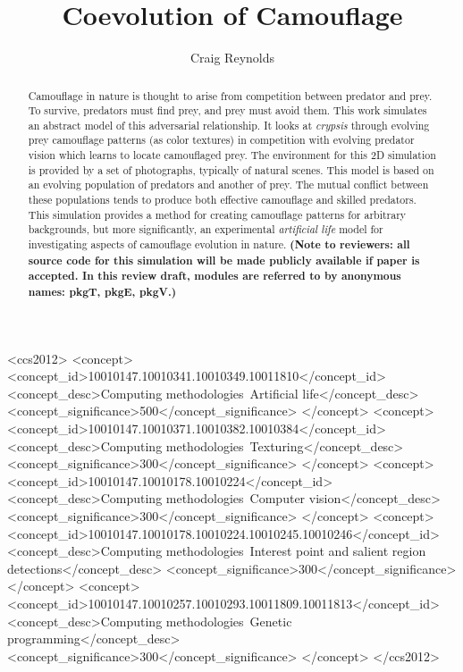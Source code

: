 \documentclass[acmtog]{acmart}
\newcommand{\texsyn}[0]{pkgT}
\newcommand{\lazypredator}[0]{pkgE}
\newcommand{\predatoreye}[0]{pkgV}
\begin{document}
\title{Coevolution of Camouflage}

\author{Craig Reynolds}

\renewcommand{\shortauthors}{Craig Reynolds}


\begin{abstract}
    Camouflage in nature is thought to arise from competition between predator and prey. To survive, predators must find prey, and prey must avoid them. This work simulates an abstract model of this adversarial relationship. It looks at \textit{crypsis} through evolving prey camouflage patterns (as color textures) in competition with evolving predator vision which learns to locate camouflaged prey. The environment for this 2D simulation is provided by a set of photographs, typically of natural scenes. This model is based on an evolving population of predators and another of prey. The mutual conflict between these populations tends to produce both effective camouflage and skilled predators. This simulation provides a method for creating camouflage patterns for arbitrary backgrounds, but more significantly, an experimental \textit{artificial life} model for investigating aspects of camouflage evolution in nature. \textbf{(Note to reviewers: all source code for this simulation will be made publicly available if paper is accepted. In this review draft, modules are referred to by anonymous names: \texsyn{}, \lazypredator{}, \predatoreye{}.)}
\end{abstract}


\begin{CCSXML}
<ccs2012>
   <concept>
       <concept_id>10010147.10010341.10010349.10011810</concept_id>
       <concept_desc>Computing methodologies~Artificial life</concept_desc>
       <concept_significance>500</concept_significance>
       </concept>
   <concept>
       <concept_id>10010147.10010371.10010382.10010384</concept_id>
       <concept_desc>Computing methodologies~Texturing</concept_desc>
       <concept_significance>300</concept_significance>
       </concept>
   <concept>
       <concept_id>10010147.10010178.10010224</concept_id>
       <concept_desc>Computing methodologies~Computer vision</concept_desc>
       <concept_significance>300</concept_significance>
       </concept>
    <concept>
       <concept_id>10010147.10010178.10010224.10010245.10010246</concept_id>
       <concept_desc>Computing methodologies~Interest point and salient region detections</concept_desc>
       <concept_significance>300</concept_significance>
       </concept>
    <concept>
        <concept_id>10010147.10010257.10010293.10011809.10011813</concept_id>
        <concept_desc>Computing methodologies~Genetic programming</concept_desc>
        <concept_significance>300</concept_significance>
        </concept>
 </ccs2012>
\end{CCSXML}
\end{document}
